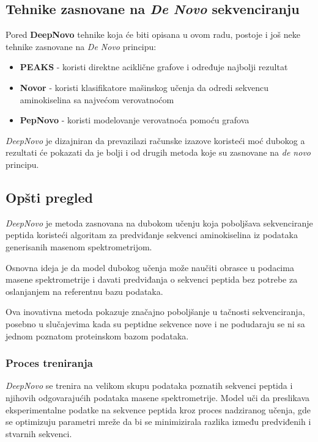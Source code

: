 \documentclass[12pt,oneside]{memoir}
\begin{document}
\subsection{Tehnike zasnovane na \emph{De Novo} sekvenciranju}
Pored \textbf{DeepNovo} tehnike koja će biti opisana u ovom radu, postoje i još neke tehnike zasnovane na \emph{De Novo} principu:

\begin{itemize}
\item \textbf{PEAKS} \cite{peaks} - koristi direktne aciklične grafove i određuje najbolji rezultat
\item \textbf{Novor} \cite{novor} - koristi klasifikatore mašinskog učenja da odredi sekvencu aminokiselina sa najvećom verovatnoćom
\item \textbf{PepNovo} \cite{pepnovo} - koristi modelovanje verovatnoća pomoću grafova
\end{itemize}

\emph{DeepNovo} je dizajniran da prevazilazi računske izazove koristeći moć dubokog a rezultati će pokazati da je bolji i od drugih metoda koje su zasnovane na \emph{de novo} principu.

\subsection{Opšti pregled}
\emph{DeepNovo} \cite{deepnovo} je metoda zasnovana na dubokom učenju koja poboljšava sekvenciranje peptida koristeći algoritam za predviđanje sekvenci aminokiselina iz podataka generisanih masenom spektrometrijom.

Osnovna ideja je da model dubokog učenja može naučiti obrasce u podacima masene spektrometrije i davati predviđanja o sekvenci peptida bez potrebe za oslanjanjem na referentnu bazu podataka.

Ova inovativna metoda pokazuje značajno poboljšanje u tačnosti sekvenciranja, posebno u slučajevima kada su peptidne sekvence nove i ne podudaraju se ni sa jednom poznatom proteinskom bazom podataka.

\subsubsection{Proces treniranja}
\emph{DeepNovo} se trenira na velikom skupu podataka poznatih sekvenci peptida i njihovih odgovarajućih podataka masene spektrometrije. Model uči da preslikava eksperimentalne podatke na sekvence peptida kroz proces nadziranog učenja, gde se optimizuju parametri mreže da bi se minimizirala razlika između predviđenih i stvarnih sekvenci.
\end{document}

